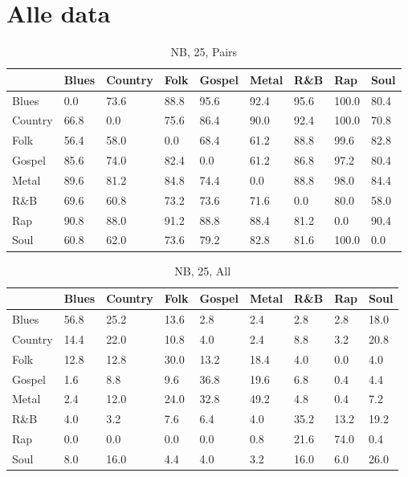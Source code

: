 \documentclass[a4paper,oneside]{article}
\begin{document}
\section{Alle data}
\begin{table}[H]\centering
\caption{NB, 25, Pairs}
\begin{tabu}{l|*{8}{l}}
 & Blues & Country & Folk & Gospel & Metal & R\&B & Rap & Soul \\ \hline
Blues & 0.0 & 73.6 & 88.8 & 95.6 & 92.4 & 95.6 & 100.0 & 80.4 \\
Country & 66.8 & 0.0 & 75.6 & 86.4 & 90.0 & 92.4 & 100.0 & 70.8 \\
Folk & 56.4 & 58.0 & 0.0 & 68.4 & 61.2 & 88.8 & 99.6 & 82.8 \\
Gospel & 85.6 & 74.0 & 82.4 & 0.0 & 61.2 & 86.8 & 97.2 & 80.4 \\
Metal & 89.6 & 81.2 & 84.8 & 74.4 & 0.0 & 88.8 & 98.0 & 84.4 \\
R\&B & 69.6 & 60.8 & 73.2 & 73.6 & 71.6 & 0.0 & 80.0 & 58.0 \\
Rap & 90.8 & 88.0 & 91.2 & 88.8 & 88.4 & 81.2 & 0.0 & 90.4 \\
Soul & 60.8 & 62.0 & 73.6 & 79.2 & 82.8 & 81.6 & 100.0 & 0.0 \\
\end{tabu}
\end{table}

\begin{table}[H]\centering
\caption{NB, 25, All}
\begin{tabu}{l|*{8}{l}}
&Blues & Country & Folk & Gospel & Metal & R\&B & Rap & Soul \\ \hline
Blues & 56.8 & 25.2 & 13.6 & 2.8 & 2.4 & 2.8 & 2.8 & 18.0 \\
Country & 14.4 & 22.0 & 10.8 & 4.0 & 2.4 & 8.8 & 3.2 & 20.8 \\
Folk & 12.8 & 12.8 & 30.0 & 13.2 & 18.4 & 4.0 & 0.0 & 4.0 \\
Gospel & 1.6 & 8.8 & 9.6 & 36.8 & 19.6 & 6.8 & 0.4 & 4.4 \\
Metal & 2.4 & 12.0 & 24.0 & 32.8 & 49.2 & 4.8 & 0.4 & 7.2 \\
R\&B & 4.0 & 3.2 & 7.6 & 6.4 & 4.0 & 35.2 & 13.2 & 19.2 \\
Rap & 0.0 & 0.0 & 0.0 & 0.0 & 0.8 & 21.6 & 74.0 & 0.4 \\
Soul & 8.0 & 16.0 & 4.4 & 4.0 & 3.2 & 16.0 & 6.0 & 26.0 \\
\end{tabu}
\end{table}
\end{document}
